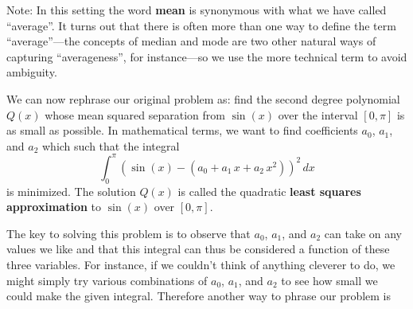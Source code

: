 {{{{\noindent
\begin{center}
\end{center}
Note:  In this setting the word {\bf mean} is synonymous with what we have called ``average''. It turns out that there is often more than one way to define the term ``average''---the concepts of median and mode are two other natural ways of capturing ``averageness'', for instance---so we use the more technical term to avoid ambiguity.

We can now rephrase our original 
problem as: find the second degree polynomial $Q(x)$ whose mean squared separation from $\sin(x)$ over the interval $[0, \pi]$ is as small as possible.  In mathematical terms, we want to find coefficients $a_0$, $a_1$, and $a_2$ which such that the integral
\[
\int_0^{\pi} \left( \sin(x) - (a_0 + a_1\,x + a_2\,x^2)\right)^2 \, dx
\]
is minimized. The solution $Q(x)$ is called the quadratic {\bf least squares approximation} to $\sin(x)$ over $[0,\pi]$.

The key to solving this problem is to observe that $a_0$, $a_1$, and $a_2$ can take on any values we like and that this integral can thus be considered a function of these three variables. For instance, if we couldn't think of anything cleverer to do, we might simply try various combinations of $a_0$, $a_1$, and $a_2$ to see how small we could make the given integral.  Therefore another way to phrase our problem is

\noindent
\begin{center}
\end{center}

}}}}
